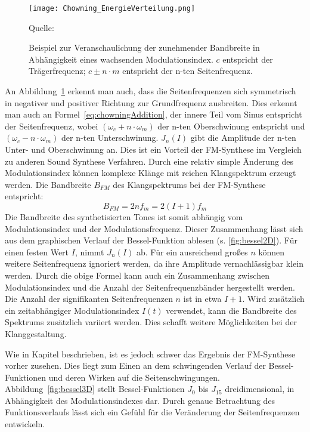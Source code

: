\begin{figure} [ht]
\centering
  \texttt{[image: Chowning\_EnergieVerteilung.png]}
\caption{Beispiel zur Veranschaulichung der zunehmender Bandbreite in Abhängigkeit eines wachsenden Modulationsindex. $c$ entspricht der Trägerfrequenz; $c\pm n\cdot m$ entspricht der n-ten Seitenfrequenz.}
\label{fig:chowningEnergieVerteilung}
Quelle: \cite{chowningPaper}
\end{figure}
\FloatBarrier

An Abbildung~\ref{fig:chowningEnergieVerteilung} erkennt man auch, dass die Seitenfrequenzen sich symmetrisch in negativer und positiver Richtung zur Grundfrequenz ausbreiten. Dies erkennt man auch an Formel~\ref{eq:chowningAddition}, der innere Teil vom Sinus entspricht der Seitenfrequenz, wobei $(\omega_c+n\cdot \omega_m)$ der n-ten Oberschwinung entspricht und $(\omega_c-n\cdot \omega_m)$ der n-ten Unterschwinung. $J_n(I)$ gibt die Amplitude der n-ten Unter- und Oberschwinung an. 
Dies ist ein Vorteil der FM-Synthese im Vergleich zu anderen Sound Synthese Verfahren. Durch eine relativ simple Änderung des Modulationsindex können komplexe Klänge mit reichen Klangspektrum erzeugt werden. Die Bandbreite $B_{FM}$ des Klangspektrums bei der FM-Synthese entspricht:\cite[S. 221]{lathi}
\begin{equation}
B_{FM}=2nf_m=2(I+1)f_m
\label{eq:fmBandwidth}
\end{equation} 
Die Bandbreite des synthetisierten Tones ist somit abhängig vom Modulationsindex und der Modulationsfrequenz. 
Dieser Zusammenhang lässt sich aus dem graphischen Verlauf der Bessel-Funktion ablesen (s. \ref{fig:bessel2D}). Für einen festen Wert $I$, nimmt $J_n(I)$ ab. Für ein ausreichend großes $n$ können weitere Seitenfrequenz ignoriert werden, da ihre Amplitude vernachlässigbar klein werden. Durch die obige Formel kann auch ein Zusammenhang zwischen Modulationsindex und die Anzahl der Seitenfrequenzbänder hergestellt werden. Die Anzahl der signifikanten Seitenfrequenzen $n$ ist in etwa $I+1$. Wird zusätzlich ein zeitabhängiger Modulationsindex $I(t)$ verwendet, kann die Bandbreite des Spektrums zusätzlich variiert werden. Dies schafft weitere Möglichkeiten bei der Klanggestaltung. 

Wie in Kapitel  beschrieben, ist es jedoch schwer das Ergebnis der FM-Synthese vorher zusehen. Dies liegt zum Einen an dem schwingenden Verlauf der Bessel-Funktionen und deren Wirken auf die Seitenschwingungen. Abbildung~\ref{fig:bessel3D} stellt Bessel-Funktionen $J_0$ bis $J_{15}$ dreidimensional, in Abhängigkeit des Modulationsindexes dar.
Durch genaue Betrachtung des Funktionsverlaufs lässt sich ein Gefühl für die Veränderung der Seitenfrequenzen entwickeln.

